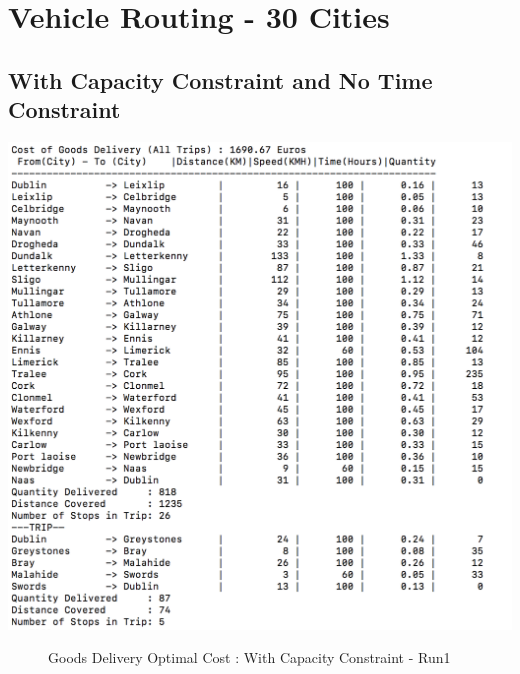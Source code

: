 \documentclass[a4paper&11pt]{article}
\begin{document}
\section*{Vehicle Routing  - 30 Cities}
\subsection*{With Capacity Constraint and No Time Constraint}
\begin{center}
\includegraphics[scale=0.8]{30fig1.png}
\begin{figure}[H]
\caption{Goods Delivery Optimal Cost :  With Capacity Constraint - Run1}
\label{fig:30fig1}
\end{figure}
\end{center}
\end{document}
